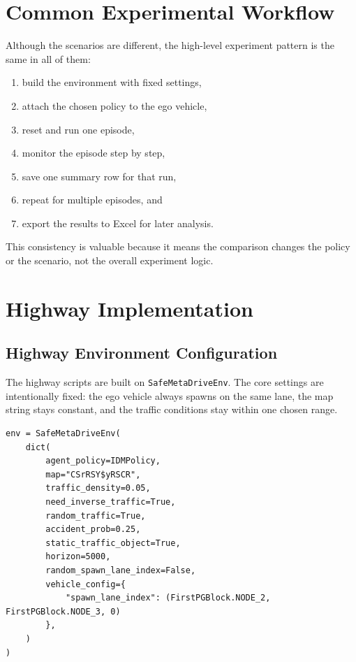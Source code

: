 \documentclass[12pt,a4paper]{report}
\begin{document}
\section{Common Experimental Workflow}
Although the scenarios are different, the high-level experiment pattern is the same in all of them:

\begin{enumerate}[label=\arabic*.]
    \item build the environment with fixed settings,
    \item attach the chosen policy to the ego vehicle,
    \item reset and run one episode,
    \item monitor the episode step by step,
    \item save one summary row for that run,
    \item repeat for multiple episodes, and
    \item export the results to Excel for later analysis.
\end{enumerate}

This consistency is valuable because it means the comparison changes the policy or the scenario, not the overall experiment logic.

\section{Highway Implementation}

\subsection{Highway Environment Configuration}
The highway scripts are built on \texttt{SafeMetaDriveEnv}. The core settings are intentionally fixed: the ego vehicle always spawns on the same lane, the map string stays constant, and the traffic conditions stay within one chosen range.

\begin{lstlisting}[caption={Representative highway configuration logic.},label={lst:highway_config},float=H]
env = SafeMetaDriveEnv(
    dict(
        agent_policy=IDMPolicy,
        map="CSrRSY$yRSCR",
        traffic_density=0.05,
        need_inverse_traffic=True,
        random_traffic=True,
        accident_prob=0.25,
        static_traffic_object=True,
        horizon=5000,
        random_spawn_lane_index=False,
        vehicle_config={
            "spawn_lane_index": (FirstPGBlock.NODE_2, FirstPGBlock.NODE_3, 0)
        },
    )
)
\end{lstlisting}
\end{document}
